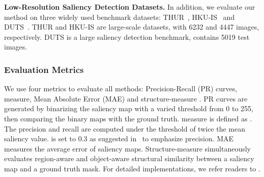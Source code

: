 \documentclass[10pt,twocolumn,letterpaper]{article}
\begin{document}
\noindent\textbf{Low-Resolution Saliency Detection Datasets.} In addition, we evaluate our method on three widely used benchmark datasets:
THUR~\cite{cheng2014salientshape}, HKU-IS~\cite{li2015visual} and DUTS~\cite{wang2017}. THUR and HKU-IS are large-scale datasets, with 6232 and 4447 images, respectively. DUTS is a large saliency detection benchmark, contains 5019 test images.
\subsubsection{Evaluation Metrics}
We use four metrics to evaluate all methods: Precision-Recall (PR) curves,  measure, Mean Absolute Error (MAE) and structure-measure \cite{fan2017structure}. PR curves are generated by binarizing the saliency map with a varied threshold from 0 to 255, then comparing the binary maps with the ground truth.  measure is defined as . The precision and recall are computed under the threshold of twice the mean saliency value.  is set to 0.3 as suggested in~\cite{achanta2009frequency} to emphasize precision. MAE measures the average error of saliency maps. Structure-measure simultaneously evaluates region-aware and object-aware structural similarity between a saliency map and a ground truth mask. For detailed implementations, we refer readers to \cite{fan2017structure}.
\end{document}
